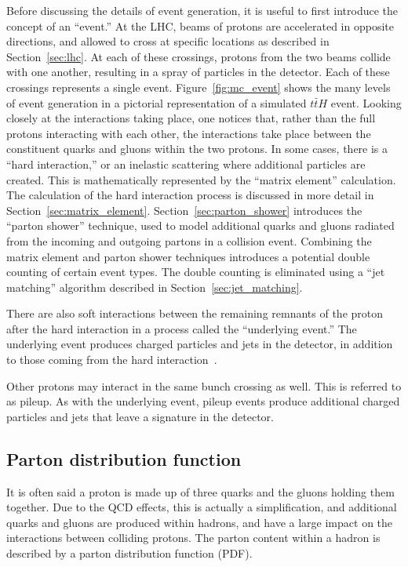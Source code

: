 Before discussing the details of event generation, it is useful to first
introduce the concept of an ``event.''
At the LHC, beams of protons are accelerated in opposite directions, and
allowed to cross at specific locations as described in Section~\ref{sec:lhc}.
At each of these crossings, protons from the two beams collide with one
another, resulting in a spray of particles in the detector.
Each of these crossings represents a single event.
Figure~\ref{fig:mc_event} shows the many levels of event generation in a
pictorial representation of a simulated $t\bar{t}H$ event.
Looking closely at the interactions taking place, one notices that,
rather than the full protons interacting with each other, the interactions
take place between the constituent quarks and gluons within the two protons.
In some cases, there is a ``hard interaction,'' or an inelastic scattering
where additional particles are created.
This is mathematically represented by the ``matrix element'' calculation.
The calculation of the hard interaction process is discussed in more detail
in Section~\ref{sec:matrix_element}.
Section~\ref{sec:parton_shower} introduces the ``parton shower'' technique,
used to model additional quarks and gluons radiated from the incoming and
outgoing partons in a collision event.
Combining the matrix element and parton shower techniques introduces a
potential double counting of certain event types.
The double counting is eliminated using a ``jet matching'' algorithm described
in Section~\ref{sec:jet_matching}.

There are also soft interactions between the remaining remnants of the proton
after the hard interaction in a process called the ``underlying event.''
The underlying event produces charged particles and jets in the detector, in
addition to those coming from the hard interaction~\cite{Field:2002vt}.

Other protons may interact in the same bunch crossing as well.
This is referred to as pileup.
As with the underlying event, pileup events produce additional charged
particles and jets that leave a signature in the detector.


\subsection{Parton distribution function}
\label{sec:pdf}

It is often said a proton is made up of three quarks and the gluons holding
them together.
Due to the QCD effects, this is actually a simplification, and additional
quarks and gluons are produced within hadrons, and have a large impact 
on the interactions between colliding protons.
The parton content within a hadron is described by a parton distribution
function (PDF).

